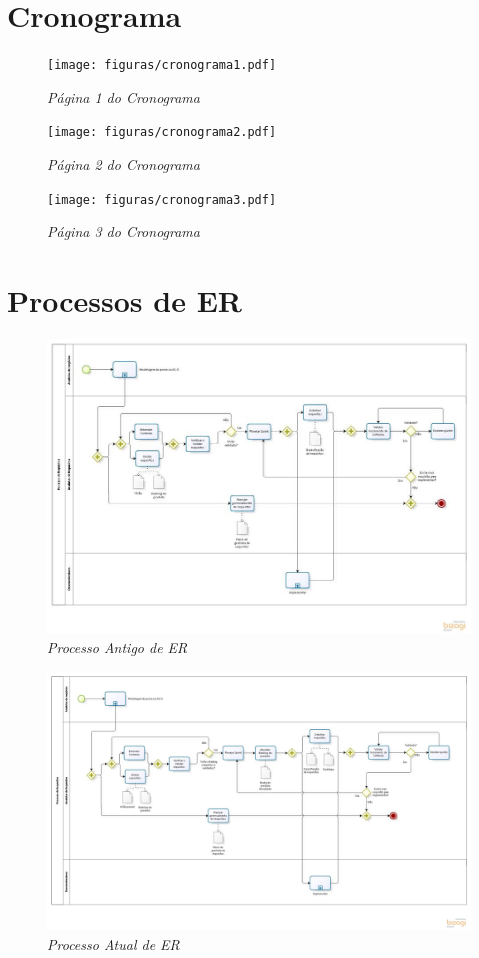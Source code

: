 \begin{apendicesenv}
\chapter{Cronograma}

\begin{figure}[H]
\centering\texttt{[image: figuras/cronograma1.pdf]}
\caption{\textit{Página 1 do Cronograma}}
\end{figure}

\begin{figure}[H]
\centering\texttt{[image: figuras/cronograma2.pdf]}
\caption{\textit{Página 2 do Cronograma}}
\end{figure}

\begin{figure}[H]
\centering\texttt{[image: figuras/cronograma3.pdf]}
\caption{\textit{Página 3 do Cronograma}}
\end{figure}

\chapter{Processos de ER}

\begin{figure}[H]
\centering\includegraphics[scale=0.5]{figuras/processoAntigo}
\caption{\textit{Processo Antigo de ER}}
\end{figure}

\begin{figure}[H]
\centering\includegraphics[scale=0.3]{figuras/processoAtual}
\caption{\textit{Processo Atual de ER}}
\end{figure}

\end{apendicesenv}
